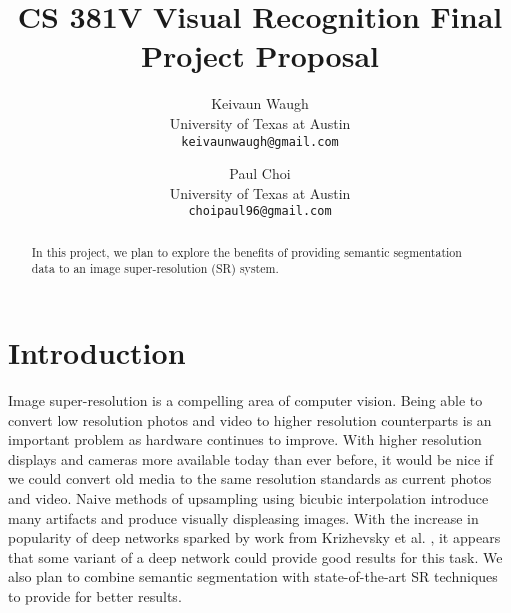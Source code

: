 \documentclass[10pt,twocolumn,letterpaper]{article}
\begin{document}
\title{CS 381V Visual Recognition Final Project Proposal}

\author{Keivaun Waugh\\
University of Texas at Austin\\
{\tt\small keivaunwaugh@gmail.com}
\and
Paul Choi\\
University of Texas at Austin\\
{\tt\small choipaul96@gmail.com}
}

\maketitle

\begin{abstract}
In this project, we plan to explore the benefits of providing semantic
segmentation data to an image super-resolution (SR) system.
\end{abstract}

\section{Introduction}
Image super-resolution is a compelling area of computer vision. Being able to
convert low resolution photos and video to higher resolution counterparts is an
important problem as hardware continues to improve. With higher resolution
displays and cameras more available today than ever before, it would be nice if
we could convert old media to the same resolution standards as current photos
and video. Naive methods of upsampling using bicubic interpolation introduce
many artifacts and produce visually displeasing images. With the increase in
popularity of deep networks sparked by work from Krizhevsky et al.
\cite{AlexNet}, it appears that some variant of a deep network could provide
good results for this task. We also plan to combine semantic segmentation with
state-of-the-art SR techniques to provide for better results.

\end{document}
